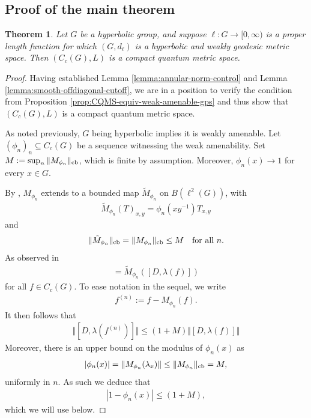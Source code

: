 \documentclass[12pt,a4paper,oneside,final,reqno]{amsart}
\theoremstyle{plain}
\newtheorem{theorem}{Theorem}[section]
\theoremstyle{definition}
\begin{document}
\subsection{Proof of the main theorem}

\begin{theorem}\label{thm:main-theorem}
    Let $G$ be a  hyperbolic group, and suppose $\ell\colon G \to [0,\infty)$ is a proper length function for which $(G,d_\ell)$ is a hyperbolic and weakly geodesic metric space. Then $(C_c(G), L)$ is a compact quantum metric space. 
\end{theorem}

\begin{proof}
   Having established Lemma \ref{lemma:annular-norm-control} and Lemma \ref{lemma:smooth-offdiagonal-cutoff}, we are in a position to verify the condition from Proposition \ref{prop:CQMS-equiv-weak-amenable-gps} and thus show that $(C_c(G), L)$ is a compact quantum metric space. 

    As noted previously, $G$ being hyperbolic implies it is weakly amenable. Let $(\phi_n)_n \subseteq C_c(G)$ be a sequence witnessing the weak amenability. 
   Set $M := \sup_n \Vert M_{\phi_n} \Vert_{\rm cb}$, which is finite by assumption. Moreover, $\phi_n(x) \to 1$ for every $x \in G$. 

   By \cite[Proposition D.6]{BrownOzawa08}, $M_{\phi_n}$ extends to a bounded map $\tilde{M}_{\phi_n}$ on $B(\ell^2(G))$, with
\begin{align*}
    \tilde{M}_{\phi_n}(T)_{x,y} = \phi_n(xy^{-1}) T_{x,y}
\end{align*}
   and
   \begin{align*}
       \Vert \tilde{M}_{\phi_n} \Vert_{\rm cb} = \Vert M_{\phi_n} \Vert_{\rm cb} \leq M \quad \text{for all $n$}.
   \end{align*}
   As observed in \cite[Lemma 3.12]{AustadGpdCQMS} 
   \begin{align*}
       [D, \lambda(M_{\phi_n}(f))] = \tilde{M}_{\phi_n} ([D, \lambda(f)]) 
   \end{align*}
    for all $f \in C_c(G)$. 
    To ease notation in the sequel, we write
    \begin{align*}
        f^{(n)} := f - M_{\phi_n}(f).
    \end{align*}
    It then follows that
    \begin{align}\label{eq:f-phinf-commutator-bound}
        \Vert [D, \lambda(f^{(n)})] \Vert \leq (1 + M) \Vert [D, \lambda(f)] \Vert
    \end{align}
    Moreover, there is  an upper bound on the modulus of $\phi_n(x)$ as
    \begin{align*}
        \vert \phi_n (x) \vert = \Vert M_{\phi_n}(\lambda_x) \Vert \leq \Vert M_{\phi_n} \Vert_{\rm cb} = M, 
    \end{align*}
    uniformly in $n$. As such we deduce that
    \begin{align*}
        | 1- \phi_n(x) | \leq (1+M) ,
    \end{align*}
    which we will use below. 
    

\end{proof}
\end{document}
